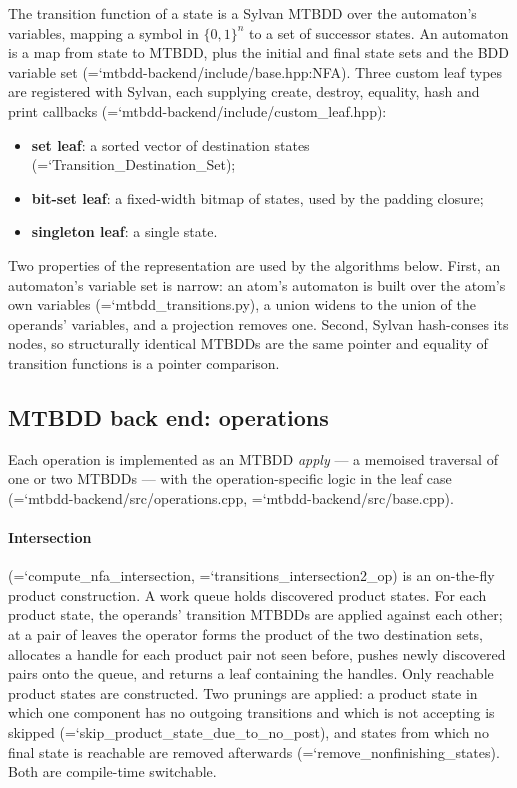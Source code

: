 \documentclass[10pt,a4paper]{article}
\newcommand{\code}[1]{{\small\ttfamily\hyphenchar\font=`\-\relax #1}}
\begin{document}
The transition function of a state is a Sylvan MTBDD over the automaton's variables, mapping a symbol
in $\{0,1\}^n$ to a set of successor states.  An automaton is a map from state to MTBDD, plus the
initial and final state sets and the BDD variable set (\code{mtbdd-backend/include/base.hpp:\allowbreak NFA}).
Three custom leaf types are registered with Sylvan, each supplying create, destroy, equality, hash and
print callbacks (\code{mtbdd-backend/include/custom\_\allowbreak leaf.hpp}):

\begin{itemize}
  \item \textbf{set leaf}: a sorted vector of destination states (\code{Transition\_Destination\_Set});
  \item \textbf{bit-set leaf}: a fixed-width bitmap of states, used by the padding closure;
  \item \textbf{singleton leaf}: a single state.
\end{itemize}

Two properties of the representation are used by the algorithms below.  First, an automaton's variable
set is narrow: an atom's automaton is built over the atom's own variables
(\code{mtbdd\_transitions.py}), a union widens to the union of the operands' variables, and a
projection removes one.  Second, Sylvan hash-conses its nodes, so structurally identical MTBDDs are the
same pointer and equality of transition functions is a pointer comparison.

\subsection{MTBDD back end: operations}

Each operation is implemented as an MTBDD \emph{apply} --- a memoised traversal of one or two MTBDDs
--- with the operation-specific logic in the leaf case
(\code{mtbdd-backend/src/operations.cpp}, \code{mtbdd-backend/src/base.cpp}).

\paragraph{Intersection} (\code{compute\_nfa\_intersection}, \code{transitions\_intersection2\_op}) is
an on-the-fly product construction.  A work queue holds discovered product states.  For each product
state, the operands' transition MTBDDs are applied against each other; at a pair of leaves the
operator forms the product of the two destination sets, allocates a handle for each product pair not
seen before, pushes newly discovered pairs onto the queue, and returns a leaf containing the handles.
Only reachable product states are constructed.  Two prunings are applied: a product state in which one
component has no outgoing transitions and which is not accepting is skipped
(\code{skip\_\allowbreak product\_\allowbreak state\_\allowbreak due\_\allowbreak to\_\allowbreak no\_\allowbreak post}), and states from which no final state is reachable are
removed afterwards (\code{remove\_nonfinishing\_states}).  Both are compile-time switchable.
\end{document}
